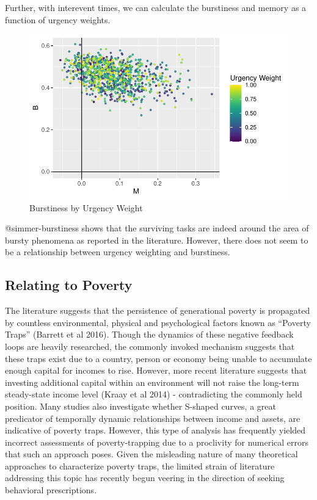 Further, with interevent times, we can calculate the burstiness and
memory as a function of urgency weights.

\begin{figure}

{\centering \includegraphics{thesis-file-ppq_files/figure-latex/simmer-burstiness-1.pdf}

}

\caption{Burstiness by Urgency Weight}

\end{figure}

@simmer-burstiness shows that the surviving tasks are indeed around the
area of bursty phenomena as reported in the literature. However, there
does not seem to be a relationship between urgency weighting and
burstiness.

\hypertarget{sec-poverty}{%
\subsection{Relating to Poverty}\label{sec-poverty}}

The literature suggests that the persistence of generational poverty is
propagated by countless environmental, physical and psychological
factors known as ``Poverty Traps'' (Barrett et al 2016). Though the
dynamics of these negative feedback loops are heavily researched, the
commonly invoked mechanism suggests that these traps exist due to a
country, person or economy being unable to accumulate enough capital for
incomes to rise. However, more recent literature suggests that investing
additional capital within an environment will not raise the long-term
steady-state income level (Kraay et al 2014) - contradicting the
commonly held position. Many studies also investigate whether S-shaped
curves, a great predicator of temporally dynamic relationships between
income and assets, are indicative of poverty traps. However, this type
of analysis has frequently yielded incorrect assessments of
poverty-trapping due to a proclivity for numerical errors that such an
approach poses. Given the misleading nature of many theoretical
approaches to characterize poverty traps, the limited strain of
literature addressing this topic has recently begun veering in the
direction of seeking behavioral prescriptions.

